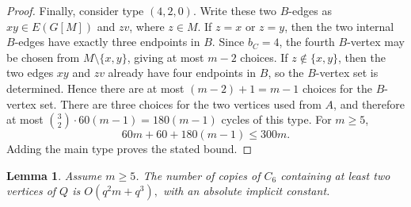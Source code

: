 \documentclass[11pt,letterpaper]{article}
\newtheorem{lemma}[theorem]{Lemma}
\begin{document}
\begin{proof}
Finally, consider type \((4,2,0)\).  Write these two $B$-edges as \(xy\in E(G[M])\) and \(zv\), where
\(z\in M\). If \(z=x\) or \(z=y\), then the two internal \(B\)-edges have exactly three endpoints in
\(B\). Since \(b_C=4\), the fourth \(B\)-vertex may be chosen from \(M\setminus\{x,y\}\), giving at
most \(m-2\) choices. If \(z\notin\{x,y\}\), then the two edges \(xy\) and \(zv\) already have four
endpoints in \(B\), so the \(B\)-vertex set is determined. Hence there are at most
\((m-2)+1=m-1\) choices for the \(B\)-vertex set. There are three choices for the two vertices used
from \(A\), and therefore at most \(\binom32\cdot60(m-1)=180(m-1)\) cycles of this type. For \(m\ge5\),
\[
  60m+60+180(m-1)\le300m.
\]
Adding the main type proves the stated bound.
\end{proof}

\begin{lemma}\label{lem:several-defects}
Assume \(m\ge5\). The number of copies of \(C_6\) containing at least two vertices of \(Q\) is
$
  O(q^2m+q^3),
$ 
with an absolute implicit constant.
\end{lemma}
\end{document}

